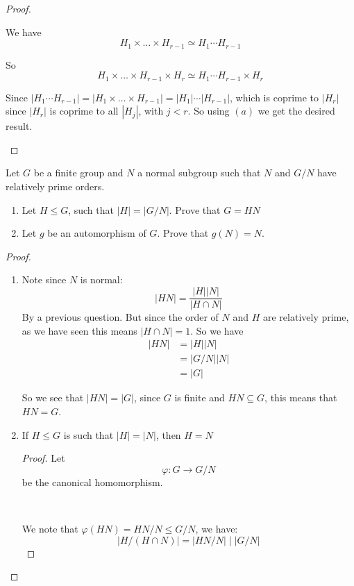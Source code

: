 \begin{exercise}
\begin{proof}
\begin{enumerate}[label = (\alph*)]
            We have \[H_1\times \ldots \times H_{r-1}\simeq H_1\cdots H_{r-1}\]

            So \[H_1\times \ldots \times H_{r-1}\times H_r \simeq H_1\cdots H_{r-1}\times H_r \]

            Since $|H_1\cdots H_{r-1}| = |H_1\times \ldots \times H_{r-1}| = |H_1| \cdots |H_{r-1}|$, which is coprime to $|H_r|$ since $|H_r|$ is coprime to all $|H_j|$, with $j<r$. So using $(a)$ we get the desired result.
        \end{enumerate}
    \end{proof}
\end{exercise}
\begin{exercise}
    Let $G$ be a finite group and $N$ a normal subgroup such that $N$ and $G/N$ have relatively prime orders.
    \begin{enumerate}[label = (\alph*)]
        \item Let $H\leq G$, such that $|H| = |G/N|$. Prove that $G = HN$
        \item Let $g$ be an automorphism of $G$. Prove that $g(N) = N$.
    \end{enumerate}
    \begin{proof}
        \begin{enumerate}[label = (\alph*)]
            \item  Note since $N$ is normal:\[|HN| = \frac{|H||N|}{|H\cap N|}\] By a previous question. But since the order of $N$ and $H$ are relatively prime, as we have seen this means $|H\cap N| = 1$.
            So we have \begin{align*}
                |HN| &= |H||N|\\
                &= |G/N||N|\\
                &= |G|
            \end{align*}

            So we see that $|HN| = |G|$, since $G$ is finite and $HN\subseteq G$, this means that $HN = G$.

            \item \begin{lemma}
                If $H\leq G$ is such that $|H| = |N|$, then $H = N$
                \begin{proof}
                    Let \[\varphi\colon G\rightarrow G/N\] be the canonical homomorphism.

                    \

                    We note that $\varphi(HN) = HN/N\leq G/N$, we have:\begin{equation}
                       |H/(H\cap N)| = |HN/N| \mid |G/N|
                    \end{equation}


\end{proof}
\end{lemma}
\end{enumerate}
\end{proof}
\end{exercise}

